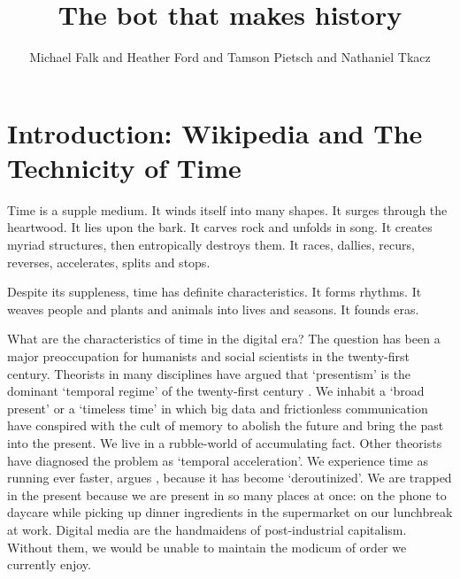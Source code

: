 \documentclass[
  Crown,
  times,
  sageh]{sagej}
\title{The bot that makes history}
\author{Michael Falk\affilnum{1} and Heather Ford\affilnum{2} and Tamson
Pietsch\affilnum{3} and Nathaniel Tkacz\affilnum{4}}
\affiliation{
    \affilnum{1} University of Melbourne \\
    \affilnum{2} University of Technology, Sydney \\
    \affilnum{3} Goldsmiths, University of London \\
  }
\begin{document}
\maketitle


\maketitle

\section{Introduction: Wikipedia and The Technicity of
Time}\label{introduction-wikipedia-and-the-technicity-of-time}

Time is a supple medium. It winds itself into many shapes. It surges
through the heartwood. It lies upon the bark. It carves rock and unfolds
in song. It creates myriad structures, then entropically destroys them.
It races, dallies, recurs, reverses, accelerates, splits and stops.

Despite its suppleness, time has definite characteristics. It forms
rhythms. It weaves people and plants and animals into lives and seasons.
It founds eras.

What are the characteristics of time in the digital era? The question
has been a major preoccupation for humanists and social scientists in
the twenty-first century. Theorists in many disciplines have argued that
`presentism' is the dominant `temporal regime' of the twenty-first
century \citep{assmann_is_2020, hartog_regimes_2017}. We inhabit a
`broad present' \citep{gumbrecht_our_2014} or a `timeless time'
\citep{castells_rise_2010} in which big data and frictionless
communication have conspired with the cult of memory to abolish the
future and bring the past into the present. We live in a rubble-world of
accumulating fact. Other theorists have diagnosed the problem as
`temporal acceleration'. We experience time as running ever faster,
argues \citet[p.~77]{wajcman_pressed_2015}, because it has become
`deroutinized'. We are trapped in the present because we are present in
so many places at once: on the phone to daycare while picking up dinner
ingredients in the supermarket on our lunchbreak at work. Digital media
are the handmaidens of post-industrial capitalism. Without them, we
would be unable to maintain the modicum of order we currently enjoy.
\end{document}
